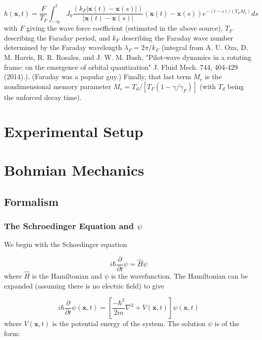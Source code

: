 \begin{equation}
h(\textbf{x},t) = \frac{F}{T_F} \int_{-\infty}^{t} J_0 \frac{(k_F |\textbf{x}(t)-\textbf{x}(s)|)}{|\textbf{x}(t)-\textbf{x}(s)|} (\textbf{x}(t)-\textbf{x}(s))e^{-(t-s)/(T_F M_e)} ds
\end{equation}
with $F$ giving the wave force coefficient (estimated in the above source), $T_F$ describing the Faraday period, and $k_F$ describing the Faraday wave number determined by the Faraday wavelength $\lambda_F = 2π/k_F$ (integral from A. U. Oza, D. M. Harris, R. R. Rosales, and J. W. M. Bush, "Pilot-wave dynamics in a rotating frame: on the emergence of orbital quantization" J. Fluid Mech. 744, 404-429 (2014).). (Faraday was a popular guy.) Finally, that last term $M_e$ is the nondimensional memory parameter $M_e = T_d/[T_F(1-\gamma / \gamma_F)]$ (with $T_d$ being the unforced decay time).

\section{Experimental Setup}

\section{Bohmian Mechanics}

\subsection{Formalism}
\subsubsection{The Schroedinger Equation and $\psi$}

We begin with the Schoedinger equation

\begin{equation}
i \hbar \frac{\partial}{\partial t}\psi = \hat H \psi
\end{equation}
where $\hat H$ is the Hamiltonian and $\psi$ is the wavefunction. The Hamiltonian can be expanded (assuming there is no electric field) to give

\begin{equation}
\label{SE}
i\hbar\frac{\partial}{\partial t} \psi(\mathbf{x},t) = \left [ \frac{-\hbar^2}{2 m}\nabla^2 + V(\mathbf{x},t)\right ] \psi(\mathbf{x},t)
\end{equation}
where $V(\mathbf{x},t)$ is the potential energy of the system. The solution $\psi$ is of the form:

